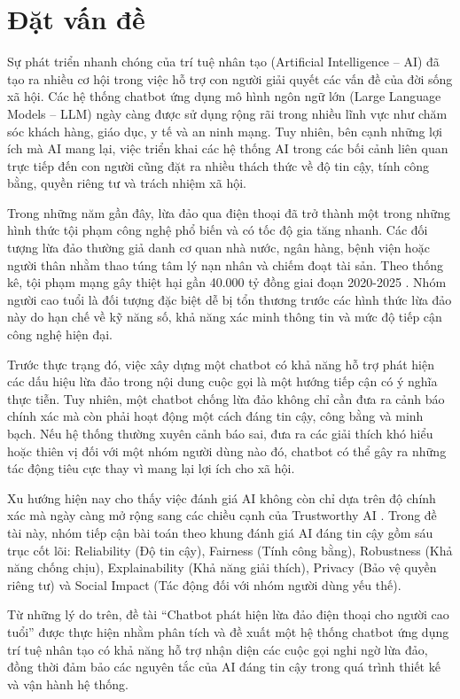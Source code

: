 \section{Đặt vấn đề}
Sự phát triển nhanh chóng của trí tuệ nhân tạo (Artificial Intelligence – AI) đã tạo ra nhiều cơ hội trong việc hỗ trợ con người giải quyết các vấn đề của đời sống xã hội. Các hệ thống chatbot ứng dụng mô hình ngôn ngữ lớn (Large Language Models – LLM) ngày càng được sử dụng rộng rãi trong nhiều lĩnh vực như chăm sóc khách hàng, giáo dục, y tế và an ninh mạng. Tuy nhiên, bên cạnh những lợi ích mà AI mang lại, việc triển khai các hệ thống AI trong các bối cảnh liên quan trực tiếp đến con người cũng đặt ra nhiều thách thức về độ tin cậy, tính công bằng, quyền riêng tư và trách nhiệm xã hội.

Trong những năm gần đây, lừa đảo qua điện thoại đã trở thành một trong những hình thức tội phạm công nghệ phổ biến và có tốc độ gia tăng nhanh. Các đối tượng lừa đảo thường giả danh cơ quan nhà nước, ngân hàng, bệnh viện hoặc người thân nhằm thao túng tâm lý nạn nhân và chiếm đoạt tài sản. Theo thống kê, tội phạm mạng gây thiệt hại gần 40.000 tỷ đồng giai đoạn 2020-2025 \cite{baochinhphu2025_toiphammang}. Nhóm người cao tuổi là đối tượng đặc biệt dễ bị tổn thương trước các hình thức lừa đảo này do hạn chế về kỹ năng số, khả năng xác minh thông tin và mức độ tiếp cận công nghệ hiện đại.

Trước thực trạng đó, việc xây dựng một chatbot có khả năng hỗ trợ phát hiện các dấu hiệu lừa đảo trong nội dung cuộc gọi là một hướng tiếp cận có ý nghĩa thực tiễn. Tuy nhiên, một chatbot chống lừa đảo không chỉ cần đưa ra cảnh báo chính xác mà còn phải hoạt động một cách đáng tin cậy, công bằng và minh bạch. Nếu hệ thống thường xuyên cảnh báo sai, đưa ra các giải thích khó hiểu hoặc thiên vị đối với một nhóm người dùng nào đó, chatbot có thể gây ra những tác động tiêu cực thay vì mang lại lợi ích cho xã hội.

Xu hướng hiện nay cho thấy việc đánh giá AI không còn chỉ dựa trên độ chính xác mà ngày càng mở rộng sang các chiều cạnh của Trustworthy AI \cite{nist_ai_rmf}. Trong đề tài này, nhóm tiếp cận bài toán theo khung đánh giá AI đáng tin cậy gồm sáu trục cốt lõi: Reliability (Độ tin cậy), Fairness (Tính công bằng), Robustness (Khả năng chống chịu), Explainability (Khả năng giải thích), Privacy (Bảo vệ quyền riêng tư) và Social Impact (Tác động đối với nhóm người dùng yếu thế).

Từ những lý do trên, đề tài “Chatbot phát hiện lừa đảo điện thoại cho người cao tuổi” được thực hiện nhằm phân tích và đề xuất một hệ thống chatbot ứng dụng trí tuệ nhân tạo có khả năng hỗ trợ nhận diện các cuộc gọi nghi ngờ lừa đảo, đồng thời đảm bảo các nguyên tắc của AI đáng tin cậy trong quá trình thiết kế và vận hành hệ thống.

